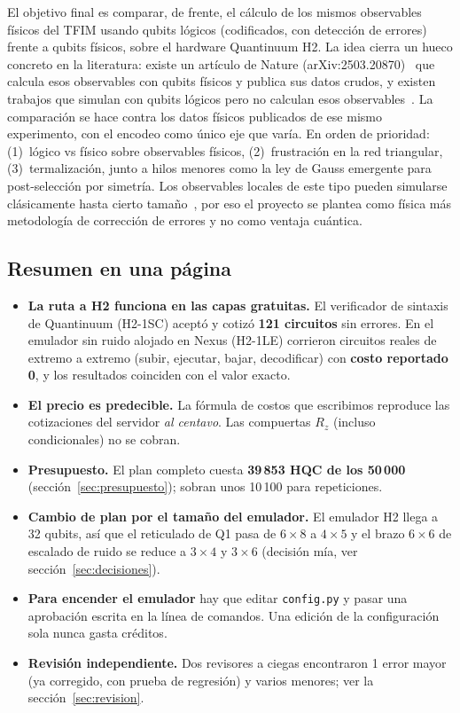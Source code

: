 \documentclass[11pt,a4paper]{article}
\begin{document}
El objetivo final es comparar, de frente, el c\'alculo de los mismos observables f\'isicos del TFIM
usando qubits l\'ogicos (codificados, con detecci\'on de errores) frente a qubits f\'isicos, sobre el
hardware Quantinuum H2. La idea cierra un hueco concreto en la literatura: existe un art\'iculo de
Nature (arXiv:2503.20870)~\cite{haghshenas2026} que calcula esos observables con qubits f\'isicos y publica sus datos
crudos, y existen trabajos que simulan con qubits l\'ogicos pero no calculan esos observables~\cite{dasu2026,froland2026}. La
comparaci\'on se hace contra los datos f\'isicos publicados de ese mismo experimento, con el encodeo
como \'unico eje que var\'ia. En orden de prioridad: (1)~l\'ogico vs f\'isico sobre observables f\'isicos,
(2)~frustraci\'on en la red triangular, (3)~termalizaci\'on, junto a hilos menores como la ley de
Gauss emergente para post-selecci\'on por simetr\'ia. Los observables locales de este tipo pueden simularse cl\'asicamente hasta cierto tama\~no~\cite{begusic2024}, por eso el proyecto se plantea como f\'isica m\'as metodolog\'ia de correcci\'on de errores y no como ventaja cu\'antica.

\subsection{Resumen en una p\'agina}
\begin{itemize}[leftmargin=1.4em]
  \item \textbf{La ruta a H2 funciona en las capas gratuitas.} El verificador de sintaxis de Quantinuum
    (H2-1SC) acept\'o y cotiz\'o \textbf{121 circuitos} sin errores. En el emulador sin ruido alojado en
    Nexus (H2-1LE) corrieron circuitos reales de extremo a extremo (subir, ejecutar, bajar, decodificar)
    con \textbf{costo reportado 0}, y los resultados coinciden con el valor exacto.
  \item \textbf{El precio es predecible.} La f\'ormula de costos que escribimos reproduce las cotizaciones
    del servidor \emph{al centavo}. Las compuertas $R_z$ (incluso condicionales) no se cobran.
  \item \textbf{Presupuesto.} El plan completo cuesta \textbf{39\,853 HQC de los 50\,000}
    (secci\'on~\ref{sec:presupuesto}); sobran unos 10\,100 para repeticiones.
  \item \textbf{Cambio de plan por el tama\~no del emulador.} El emulador H2 llega a 32 qubits, as\'i que
    el reticulado de Q1 pasa de $6{\times}8$ a $4{\times}5$ y el brazo $6{\times}6$ de escalado de ruido se
    reduce a $3{\times}4$ y $3{\times}6$ (decisi\'on m\'ia, ver secci\'on~\ref{sec:decisiones}).
  \item \textbf{Para encender el emulador} hay que editar \texttt{config.py} y pasar una aprobaci\'on
    escrita en la l\'inea de comandos. Una edici\'on de la configuraci\'on sola nunca gasta cr\'editos.
  \item \textbf{Revisi\'on independiente.} Dos revisores a ciegas encontraron 1 error mayor (ya
    corregido, con prueba de regresi\'on) y varios menores; ver la secci\'on~\ref{sec:revision}.
\end{itemize}
\end{document}
